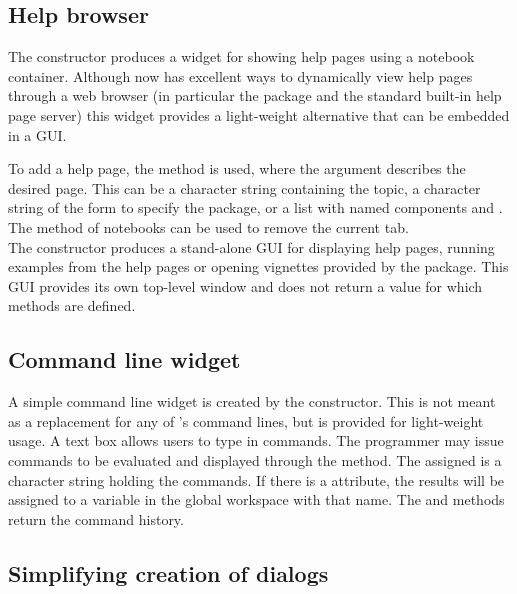 \subsection{Help browser}
\label{sec:gWidgets-help-browser}

The  constructor produces a widget for showing help
pages using a notebook container. Although \R\/ now has excellent
ways to dynamically view help pages through a web browser (in
particular the  package and the standard built-in help
page server) this widget provides a light-weight alternative that can
be embedded in a GUI.

To add a help page, the  method is used,
where the  argument describes the desired page. This can
be a character string containing the topic, a character string of the
form  to specify the package, or a list with
named components  and .  The
 method of notebooks can be used to remove the
current tab.
\\

The  constructor produces a stand-alone
GUI for displaying help pages, running examples from the help pages or
opening vignettes provided by the package. This GUI provides its own
top-level window and does not return a value for which methods are defined.



\subsection{Command line widget}
\label{sec:gWidgets-command-line-widget}



A simple command line widget is created by the
 constructor. This is not meant as a
replacement for any of \R's command lines, but is provided for
light-weight usage. A text box allows users to type in \R\/
commands. The programmer may issue commands to be evaluated and
displayed through the  method. The
 assigned is a character string holding the commands. If
there is a  attribute, the results will be assigned to a variable
in the global workspace with that name. The  and \code{[}
methods return the command history.

\subsection{Simplifying creation of dialogs}
\label{sec:gWidgets-designing-forms}

